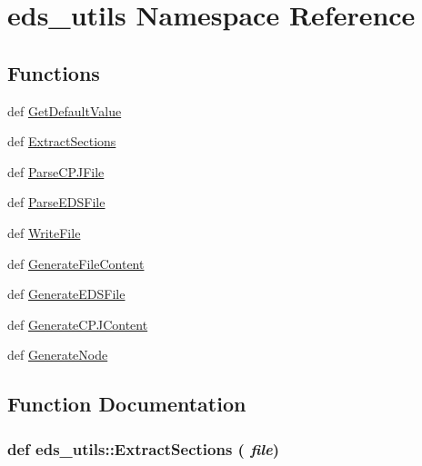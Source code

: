 \hypertarget{namespaceeds__utils}{
\section{eds\_\-utils Namespace Reference}
\label{namespaceeds__utils}
}


\subsection*{Functions}
\begin{CompactItemize}
\item 
def \hyperlink{namespaceeds__utils_0b06caabd41984790859ebfc43cde92e}{Get\-Default\-Value}
\item 
def \hyperlink{namespaceeds__utils_e4a6a8a588b73b45bef3d37909d1ec26}{Extract\-Sections}
\item 
def \hyperlink{namespaceeds__utils_b8868ba2aa41bd47b62a8cde2962833c}{Parse\-CPJFile}
\item 
def \hyperlink{namespaceeds__utils_5e20b6c101dcf976b8fedf20d9e1b739}{Parse\-EDSFile}
\item 
def \hyperlink{namespaceeds__utils_d9540832adbe476f1ba6a0cafcbbafbc}{Write\-File}
\item 
def \hyperlink{namespaceeds__utils_535cc0359a4d2f59718b381b40915ebe}{Generate\-File\-Content}
\item 
def \hyperlink{namespaceeds__utils_0c22661f0eadca172b3ee5eda06401c3}{Generate\-EDSFile}
\item 
def \hyperlink{namespaceeds__utils_6ec7fa0870074fd7e67037cd1dd55e6f}{Generate\-CPJContent}
\item 
def \hyperlink{namespaceeds__utils_1d636df1ab11a25fa4ab4b479fd05e5e}{Generate\-Node}
\end{CompactItemize}


\subsection{Function Documentation}
\hypertarget{namespaceeds__utils_e4a6a8a588b73b45bef3d37909d1ec26}{
\subsubsection[ExtractSections]{\setlength{\rightskip}{0pt plus 5cm}def eds\_\-utils::Extract\-Sections ( {\em file})}}
\label{namespaceeds__utils_e4a6a8a588b73b45bef3d37909d1ec26}




